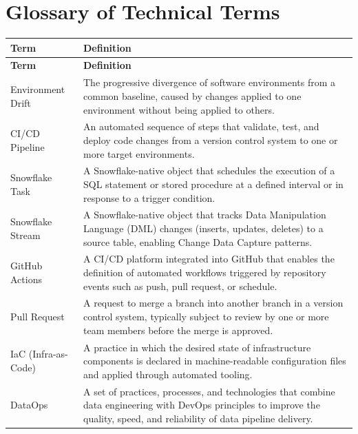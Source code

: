 
\chapter{Glossary of Technical Terms}
\label{app:glossary}

\begin{longtable}{l p{10cm}}
  \toprule
  \rowcolor{ibmblue!15}
  \textbf{Term} & \textbf{Definition} \\
  \midrule
  \endfirsthead
  \toprule
  \rowcolor{ibmblue!15}
  \textbf{Term} & \textbf{Definition} \\
  \midrule
  \endhead
  \bottomrule
  \endfoot

  Environment Drift       & The progressive divergence of software environments from a common baseline, caused by changes applied to one environment without being applied to others. \\[6pt]
  CI/CD Pipeline          & An automated sequence of steps that validate, test, and deploy code changes from a version control system to one or more target environments. \\[6pt]
  Snowflake Task          & A Snowflake-native object that schedules the execution of a SQL statement or stored procedure at a defined interval or in response to a trigger condition. \\[6pt]
  Snowflake Stream        & A Snowflake-native object that tracks Data Manipulation Language (DML) changes (inserts, updates, deletes) to a source table, enabling Change Data Capture patterns. \\[6pt]
  GitHub Actions          & A CI/CD platform integrated into GitHub that enables the definition of automated workflows triggered by repository events such as push, pull request, or schedule. \\[6pt]
  Pull Request            & A request to merge a branch into another branch in a version control system, typically subject to review by one or more team members before the merge is approved. \\[6pt]
  IaC (Infra-as-Code)     & A practice in which the desired state of infrastructure components is declared in machine-readable configuration files and applied through automated tooling. \\[6pt]
  DataOps                 & A set of practices, processes, and technologies that combine data engineering with DevOps principles to improve the quality, speed, and reliability of data pipeline delivery. \\[6pt]

\end{longtable}
